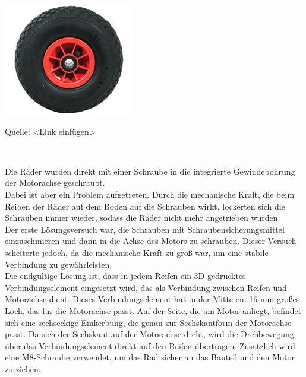 \documentclass[ngerman,12pt,a4paper]{article}
\begin{document}
	\begin{center} 
		\begin{minipage}[t]{0.39\textwidth}
			\includegraphics{Pictures/Rad}
			\label{fig: Rad}
			\vspace{-10pt}
			\begin{center}
				\par\small Quelle: <Link einfügen>
			\end{center}
		\end{minipage} \\[0.75cm]
	\end{center}
	Die Räder wurden direkt mit einer Schraube in die integrierte Gewindebohrung der Motorachse geschraubt. \\[0.5cm]
	Dabei ist aber ein Problem aufgetreten. Durch die mechanische Kraft, die beim Reiben der Räder auf dem Boden auf die Schrauben wirkt, lockerten sich die Schrauben immer wieder, sodass die Räder nicht mehr angetrieben wurden.\\[0.5cm]
	Der erste Lösungsversuch war, die Schrauben mit Schraubensicherungsmittel einzuschmieren und dann in die Achse des Motors zu schrauben. Dieser Versuch scheiterte jedoch, da die mechanische Kraft zu groß war, um eine stabile Verbindung zu gewährleisten.\\[0.5cm]
	Die endgültige Lösung ist, dass in jedem Reifen ein 3D-gedrucktes Verbindungselement eingesetzt wird, das als Verbindung zwischen Reifen und Motorachse dient. Dieses Verbindungselement hat in der Mitte ein 16 mm großes Loch, das für die Motorachse passt. Auf der Seite, die am Motor anliegt, befindet sich eine sechseckige Einkerbung, die genau zur Sechskantform der Motorachse passt. Da sich der Sechskant auf der Motorachse dreht, wird die Drehbewegung über das Verbindungselement direkt auf den Reifen übertragen. Zusätzlich wird eine M8-Schraube verwendet, um das Rad sicher an das Bauteil und den Motor zu ziehen.  
\end{document}
